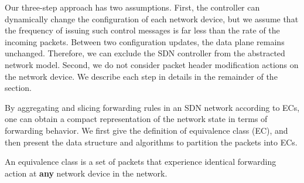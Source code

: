 Our three-step approach has two assumptions. First, the controller can dynamically change the configuration of each network device,
but we assume that the frequency of issuing such control messages is far less than the rate of the incoming packets.
Between two configuration updates, the data plane remains unchanged.
Therefore, we can exclude the SDN controller from the abstracted network model.
Second, we do not consider packet header modification actions on the network device.
We describe each step in details in the remainder of the section.


\label{OBS:Sec:IdentifyEC}

By aggregating and slicing forwarding rules in an SDN network according to ECs, one can obtain a compact representation of the network state in terms of forwarding behavior.
We first give the definition of equivalence class (EC), and then present the data structure and algorithms to partition the packets into ECs.
\begin{definition}
An equivalence class is a set of packets that experience identical forwarding action at \textbf{any} network device in the network.
\label{OBS:Def:EC}
\end{definition}

